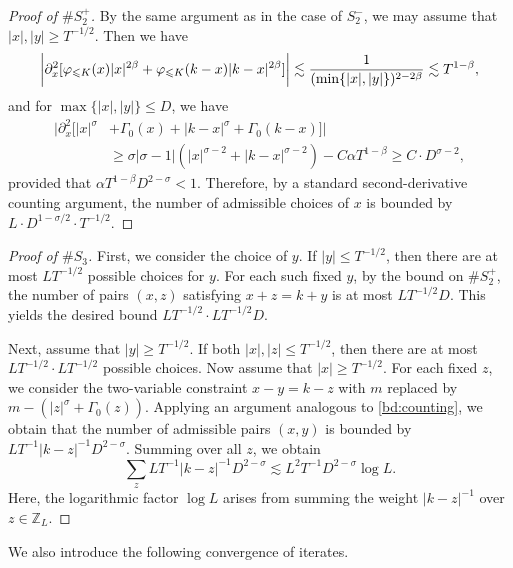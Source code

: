 \documentclass[UTF-8,reqno]{amsart}
\numberwithin{equation}{section}
\theoremstyle{definition}
\def\min{{\mathord{{\rm min}}}}
\def\geq{\geqslant}
\def\leq{\leqslant}
\def\min{{\mathord{{\rm min}}}}
\def\geq{\geqslant}
\def\leq{\leqslant}
\begin{document}
\begin{proof}[Proof of $\#S_2^+$]
By the same argument as in the case of $S_2^-$, we may assume that $|x|,|y|\geq T^{-1/2}$. Then we have 
 \begin{align*}
        \bigg|\partial_x^2[\varphi_{\leq K}(x)|x|^{2\beta}+\varphi_{\leq K}(k-x)|k-x|^{2\beta}]\bigg|\lesssim \frac{1}{(\min\{|x|,|y|\})^{2-2\beta}}\lesssim T^{1-\beta},
    \end{align*}
    and for $\max\{|x|,|y|\}\leq D$, we have
    \begin{align*}
       \bigg| \partial_x^2[|x|^\sigma&+\Gamma_0(x)+|k-x|^\sigma+\Gamma_0(k-x)]\bigg|\\
       &\geq \sigma|\sigma-1|( |x|^{\sigma-2}+|k-x|^{\sigma-2})-C\alpha T^{1-\beta}\geq C\cdot D^{\sigma-2},
    \end{align*}
 provided that $\alpha T^{1-\beta}D^{2-\sigma}<1$.  Therefore, by a standard second-derivative counting argument, the number of admissible choices of $x$ is bounded by $L \cdot D^{1-\sigma/2} \cdot T^{-1/2}$.
\end{proof}
\begin{proof}[Proof of $\#S_3$] First, we consider the choice of $y$. If $|y|\leq T^{-1/2}$, then there are at most $L T^{-1/2}$ possible choices for $y$. For each such fixed $y$, by the bound on $\#S_2^+$, the number of pairs $(x,z)$ satisfying $x+z=k+y$ is at most $L T^{-1/2} D$. This yields the desired bound $L T^{-1/2}\cdot L T^{-1/2} D$.

Next, assume that $|y|\geq T^{-1/2}$. If both $|x|,|z|\leq T^{-1/2}$, then there are at most $L T^{-1/2}\cdot L T^{-1/2}$ possible choices.  Now assume that $|x|\geq T^{-1/2}$. For each fixed $z$, we consider the two-variable constraint   $x-y=k-z$ with $m$ replaced by $m-(|z|^\sigma+\Gamma_0(z))$.  Applying an argument analogous to \eqref{bd:counting}, we obtain that the number of admissible pairs $(x,y)$ is bounded by   $LT^{-1}|k-z|^{-1}D^{2-\sigma}$. Summing over all $z$, we obtain
$$\sum_{z}LT^{-1}|k-z|^{-1}D^{2-\sigma}\lesssim L^{2}T^{-1}D^{2-\sigma}\log L.$$ Here, the logarithmic factor $\log L$ arises from summing the weight $|k-z|^{-1}$ over $z\in\mathbb{Z}_L$.
\end{proof}


We also introduce the following convergence of iterates.
\end{document}
